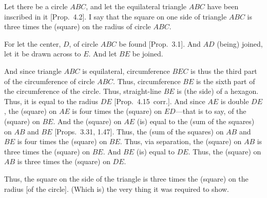\begin{Parallel}{}{}
{Let there be a circle $ABC$, and let the equilateral triangle $ABC$ have
been inscribed in it  [Prop.~4.2]. I say that the square on one side of triangle
$ABC$ is three times the (square) on the radius of circle $ABC$. 

\epsfysize=2.5in
\centerline{}

For let the center, $D$, of circle $ABC$ be found [Prop.~3.1].
And  $AD$ (being) joined, let it be drawn across to $E$. 
And let $BE$ be joined.

And since triangle $ABC$ is equilateral, circumference $BEC$ is thus the
third part of the circumference of circle $ABC$. Thus, 
circumference $BE$ is the sixth part of the circumference of the circle. 
Thus, straight-line $BE$ is (the side) of a hexagon. Thus, it is equal to the radius
$DE$ [Prop.~4.15~corr.]. And since $AE$ is double $DE$, the (square)
on $AE$ is four times the (square) on $ED$---that is to say, of the
(square) on $BE$.  And the (square) on $AE$ (is) equal to
the (sum of the squares) on $AB$ and $BE$ [Props.~3.31, 1.47]. 
Thus, the (sum of the squares) on $AB$ and $BE$ is four times the
(square) on $BE$. Thus, via separation, the (square) on $AB$ is three
times the (square) on $BE$. And $BE$ (is) equal to $DE$. Thus, the
(square) on $AB$ is three times the (square) on $DE$.

Thus, the square on the side of the triangle is three times the (square)
on the radius [of the circle]. (Which is) the very thing it was required to show.}
\end{Parallel}

